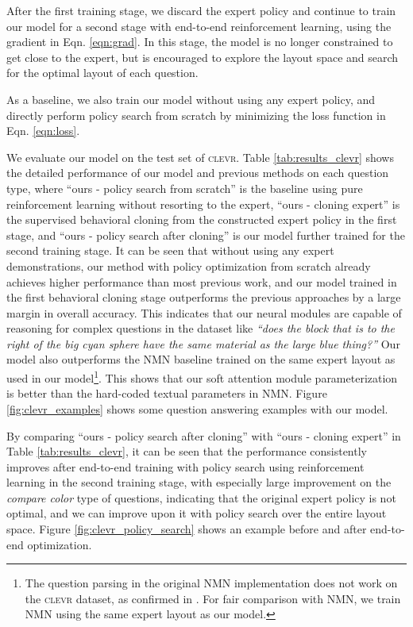 \documentclass[10pt,twocolumn,letterpaper]{article}
\newcommand{\clevr}{\textsc{clevr}\xspace}
\begin{document}
After the first training stage, we discard the expert policy and continue to train our model for a second stage with end-to-end reinforcement learning, using the gradient in Eqn. \ref{eqn:grad}. In this stage, the model is no longer constrained to get close to the expert, but is encouraged to explore the layout space and search for the optimal layout of each question.

As a baseline, we also train our model without using any expert policy, and directly perform policy search from scratch by minimizing the loss function  in Eqn. \ref{eqn:loss}.

We evaluate our model on the test set of \clevr. Table \ref{tab:results_clevr} shows the detailed performance of our model and previous methods on each question type, where ``ours - policy search from scratch'' is the baseline using pure reinforcement learning without resorting to the expert, ``ours - cloning expert'' is the supervised behavioral cloning from the constructed expert policy in the first stage, and ``ours - policy search after cloning'' is our model further trained for the second training stage. It can be seen that without using any expert demonstrations, our method with policy optimization from scratch already achieves higher performance than most previous work, and our model trained in the first behavioral cloning stage outperforms the previous approaches by a large margin in overall accuracy. This indicates that our neural modules are capable of reasoning for complex questions in the dataset like \textit{``does the block that is to the right of the big cyan sphere have the same material as the large blue thing?''} Our model also outperforms the NMN baseline \cite{andreas16neural} trained on the same expert layout as used in our model\footnote{The question parsing in the original NMN implementation does not work on the \clevr dataset, as confirmed in \cite{johnson2017clevr}. For fair comparison with NMN, we train NMN using the same expert layout as our model.}. This shows that our soft attention module parameterization is better than the hard-coded textual parameters in NMN. Figure \ref{fig:clevr_examples} shows some question answering examples with our model.

By comparing ``ours - policy search after cloning'' with ``ours - cloning expert'' in Table \ref{tab:results_clevr}, it can be seen that the performance consistently improves after end-to-end training with policy search using reinforcement learning in the second training stage, with especially large improvement on the \textit{compare color} type of questions, indicating that the original expert policy is not optimal, and we can improve upon it with policy search over the entire layout space. Figure \ref{fig:clevr_policy_search} shows an example before and after end-to-end optimization.
\end{document}
